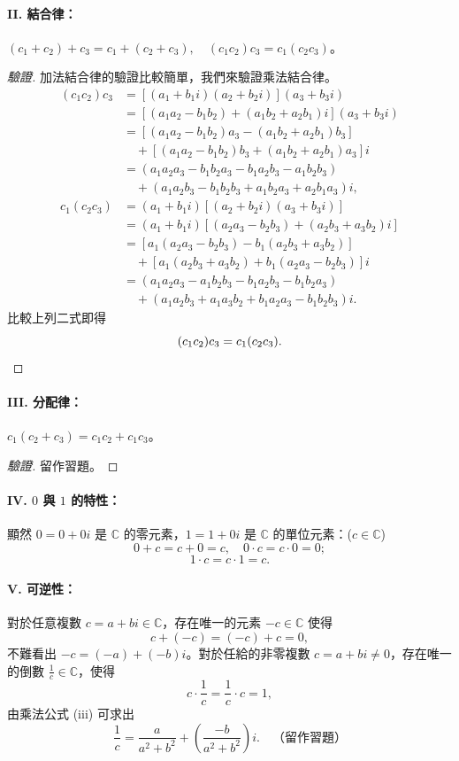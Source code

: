 \paragraph{II. 結合律：} $(c_1+c_2)+c_3 = c_1+(c_2+c_3), \quad (c_1c_2)c_3 = c_1(c_2c_3)$。
\begin{proof}[驗證]
加法結合律的驗證比較簡單，我們來驗證乘法結合律。
\begin{align*}
(c_1c_2)c_3 &= [(a_1+b_1i)(a_2+b_2i)](a_3+b_3i) \\
&= [(a_1a_2-b_1b_2)+(a_1b_2+a_2b_1)i](a_3+b_3i) \\
&= [(a_1a_2-b_1b_2)a_3-(a_1b_2+a_2b_1)b_3] \\
&\quad + [(a_1a_2-b_1b_2)b_3+(a_1b_2+a_2b_1)a_3]i \\
&= (a_1a_2a_3-b_1b_2a_3-b_1a_2b_3-a_1b_2b_3) \\
&\quad + (a_1a_2b_3-b_1b_2b_3+a_1b_2a_3+a_2b_1a_3)i,
\end{align*}
\begin{align*}
c_1(c_2c_3) &= (a_1+b_1i)[(a_2+b_2i)(a_3+b_3i)] \\
&= (a_1+b_1i)[(a_2a_3-b_2b_3)+(a_2b_3+a_3b_2)i] \\
&= [a_1(a_2a_3-b_2b_3)-b_1(a_2b_3+a_3b_2)] \\
&\quad + [a_1(a_2b_3+a_3b_2)+b_1(a_2a_3-b_2b_3)]i \\
&= (a_1a_2a_3-a_1b_2b_3-b_1a_2b_3-b_1b_2a_3) \\
&\quad + (a_1a_2b_3+a_1a_3b_2+b_1a_2a_3-b_1b_2b_3)i.
\end{align*}
比較上列二式即得
\[
(c_1c_2)c_3 = c_1(c_2c_3). \qedhere
\]
\end{proof}

\paragraph{III. 分配律：} $c_1(c_2+c_3) = c_1c_2+c_1c_3$。
\begin{proof}[驗證]
留作習題。
\end{proof}

\paragraph{IV. $0$ 與 $1$ 的特性：} 顯然 $0=0+0i$ 是 $\mathbb{C}$ 的零元素，$1=1+0i$ 是 $\mathbb{C}$ 的單位元素：($c \in \mathbb{C}$)
\[
0+c=c+0=c, \quad 0\cdot c = c\cdot 0 = 0;
\]
\[
1\cdot c = c\cdot 1 = c.
\]

\paragraph{V. 可逆性：} 對於任意複數 $c=a+bi \in \mathbb{C}$，存在唯一的元素 $-c \in \mathbb{C}$ 使得
\[
c+(-c)=(-c)+c=0,
\]
不難看出 $-c=(-a)+(-b)i$。對於任給的非零複數 $c=a+bi \neq 0$，存在唯一的倒數 $\frac{1}{c} \in \mathbb{C}$，使得
\[
c\cdot\frac{1}{c} = \frac{1}{c}\cdot c = 1,
\]
由乘法公式 (iii) 可求出
\[
\frac{1}{c} = \frac{a}{a^2+b^2} + \left(\frac{-b}{a^2+b^2}\right)i. \quad \text{（留作習題）}
\]

